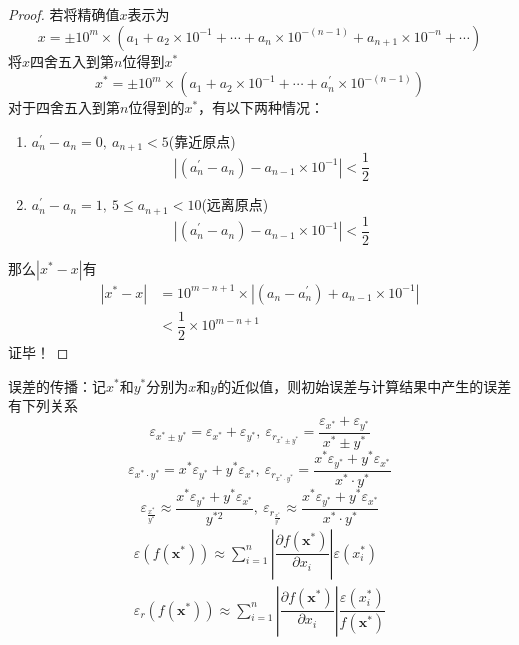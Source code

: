 \begin{proof}
    若将精确值$x$表示为
    \[
        x = \pm 10^m\times \left( a_1+a_2\times 10^{-1}+\cdots+a_n\times 10^{-(n-1)}+a_{n+1}\times 10^{-n}+\cdots \right)
    \]
    将$x$四舍五入到第$n$位得到$x^*$
    \[
        x^* = \pm 10^m\times \left( a_1+a_2\times 10^{-1}+\cdots+a_n^{\prime}\times 10^{-(n-1)} \right)
    \]
    对于四舍五入到第$n$位得到的$x^*$，有以下两种情况：
    \begin{enumerate}
        \item $a_n^{\prime}-a_n = 0,\ a_{n+1}<5$(靠近原点)
        \[
            \left| (a_n^{\prime}-a_n) - a_{n-1}\times 10^{-1} \right|<\dfrac{1}{2}
        \]
        \item $a_n^{\prime}-a_n = 1,\ 5\leqslant a_{n+1}<10$(远离原点)
        \[
            \left| (a_n^{\prime}-a_n) - a_{n-1}\times 10^{-1} \right|<\dfrac{1}{2}
        \]
    \end{enumerate}
    那么$|x^*-x|$有
    \[
        \begin{array}{ll}
            |x^*-x| &= 10^{m-n+1}\times \left| (a_n-a_n^{\prime}) + a_{n-1}\times 10^{-1} \right|\\
            &<\dfrac{1}{2}\times 10^{m-n+1}
        \end{array} 
    \]证毕！
\end{proof}
\begin{note}
    误差的传播：记$x^*$和$y^*$分别为$x$和$y$的近似值，则初始误差与计算结果中产生的误差有下列关系
    \[
        \varepsilon_{x^*\pm y^*} = \varepsilon_{x^*}+\varepsilon_{y^*},\ \varepsilon_{r_{x^*\pm y^*}} = \dfrac{\varepsilon_{x^*}+\varepsilon_{y^*}}{x^{*}\pm y^{*}}
    \]
    \[
        \varepsilon_{x^*\cdot y^*} = x^*\varepsilon_{y^*}+y^*\varepsilon_{x^*},\ \varepsilon_{r_{x^*\cdot y^*}} = \dfrac{x^*\varepsilon_{y^*}+y^*\varepsilon_{x^*}}{x^{*}\cdot y^{*}}
    \]
    \[
        \varepsilon_{\frac{x^*}{y^*}} \approx \dfrac{x^*\varepsilon_{y^*}+y^*\varepsilon_{x^*}}{y^{*2}},\ \varepsilon_{r_{\frac{x^*}{y^*}}} \approx \dfrac{x^*\varepsilon_{y^*}+y^*\varepsilon_{x^*}}{x^{*}\cdot y^{*}}
    \]
    \[
        \begin{array}{c}
            \varepsilon(f(\boldsymbol{x}^*))\approx \sum\limits_{i = 1}^{n}\left|\dfrac{\partial f(\boldsymbol{x}^*)}{\partial x_i}\right|\varepsilon(x_i^*)\\
            \varepsilon_r(f(\boldsymbol{x}^*))\approx \sum\limits_{i = 1}^{n}\left|\dfrac{\partial f(\boldsymbol{x}^*)}{\partial x_i}\right|\dfrac{\varepsilon(x_i^*)}{f(\boldsymbol{x}^*)}
        \end{array}
    \]
\end{note}
